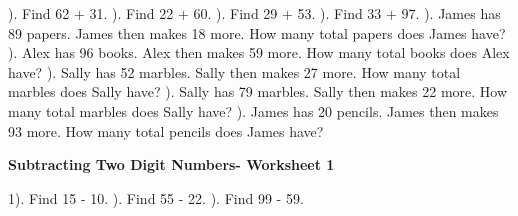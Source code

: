 \documentclass{article}%
\begin{document}
\newline%
). Find 62 + 31.%
\newline%
\newline%
). Find 22 + 60.%
\newline%
\newline%
). Find 29 + 53.%
\newline%
\newline%
). Find 33 + 97.%
\newline%
\newline%
). James has 89 papers. James then makes 18 more. How many total papers does James have?%
\newline%
\newline%
). Alex has 96 books. Alex then makes 59 more. How many total books does Alex have?%
\newline%
\newline%
). Sally has 52 marbles. Sally then makes 27 more. How many total marbles does Sally have?%
\newline%
\newline%
). Sally has 79 marbles. Sally then makes 22 more. How many total marbles does Sally have?%
\newline%
\newline%
). James has 20 pencils. James then makes 93 more. How many total pencils does James have?%
\newline%
\newline%
\newline%
\pagebreak%
\large%
\begin{center}%
\textbf{Subtracting Two Digit Numbers- Worksheet 1}%
\newline%
\end{center} \normalsize%
1). Find 15 {-} 10.%
\newline%
\newline%
). Find 55 {-} 22.%
\newline%
\newline%
). Find 99 {-} 59.%
\newline%
\end{document}
